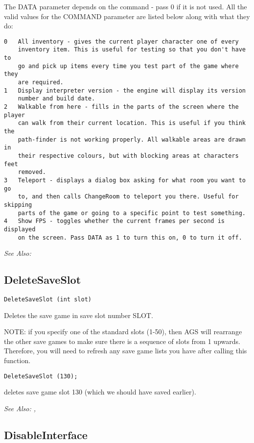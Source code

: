 The DATA parameter depends on the command - pass 0 if it is not used.
All the valid values for the COMMAND parameter are listed below along with
what they do:
\begin{verbatim}
0   All inventory - gives the current player character one of every
    inventory item. This is useful for testing so that you don't have to
    go and pick up items every time you test part of the game where they
    are required.
1   Display interpreter version - the engine will display its version
    number and build date.
2   Walkable from here - fills in the parts of the screen where the player
    can walk from their current location. This is useful if you think the
    path-finder is not working properly. All walkable areas are drawn in
    their respective colours, but with blocking areas at characters feet
    removed.
3   Teleport - displays a dialog box asking for what room you want to go
    to, and then calls ChangeRoom to teleport you there. Useful for skipping
    parts of the game or going to a specific point to test something.
4   Show FPS - toggles whether the current frames per second is displayed
    on the screen. Pass DATA as 1 to turn this on, 0 to turn it off.
\end{verbatim}

\it{See Also:} 


\subsection{DeleteSaveSlot}\label{DeleteSaveSlot}%

\begin{verbatim}
DeleteSaveSlot (int slot)
\end{verbatim}
Deletes the save game in save slot number SLOT.

NOTE: if you specify one of the standard slots (1-50), then AGS will rearrange the other
save games to make sure there is a sequence of slots from 1 upwards. Therefore, you will
need to refresh any save game lists you have after calling this function.

\begin{verbatim}
DeleteSaveSlot (130);
\end{verbatim}
deletes save game slot 130 (which we should have saved earlier).

\it{See Also:} , 


\subsection{DisableInterface}\label{DisableInterface}%

